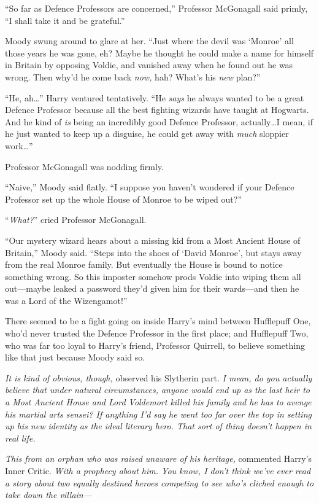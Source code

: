 “So far as Defence Professors are concerned,” Professor McGonagall said primly, “I shall take it and be grateful.”

Moody swung around to glare at her. “Just where the devil was ‘Monroe’ all those years he was gone, eh? Maybe he thought he could make a name for himself in Britain by opposing Voldie, and vanished away when he found out he was wrong. Then why’d he come back \emph{now,} hah? What’s his \emph{new} plan?”

“He, ah…” Harry ventured tentatively. “He \emph{says} he always wanted to be a great Defence Professor because all the best fighting wizards have taught at Hogwarts. And he kind of \emph{is} being an incredibly good Defence Professor, actually…I mean, if he just wanted to keep up a disguise, he could get away with \emph{much} sloppier work…”

Professor McGonagall was nodding firmly.

“Naive,” Moody said flatly. “I suppose you haven’t wondered if your Defence Professor set up the whole House of Monroe to be wiped out?”

“\emph{What?}” cried Professor McGonagall.

“Our mystery wizard hears about a missing kid from a Most Ancient House of Britain,” Moody said. “Steps into the shoes of ‘David Monroe’, but stays away from the real Monroe family. But eventually the House is bound to notice something wrong. So this imposter somehow prods Voldie into wiping them all out—maybe leaked a password they’d given him for their wards—and then he was a Lord of the Wizengamot!”

There seemed to be a fight going on inside Harry’s mind between Hufflepuff One, who’d never trusted the Defence Professor in the first place; and Hufflepuff Two, who was far too loyal to Harry’s friend, Professor Quirrell, to believe something like that just because Moody said so.

\emph{It \emph{is} kind of obvious, though,} observed his Slytherin part. \emph{I mean, do you actually believe that under natural circumstances, anyone would end up as the last heir to a Most Ancient House \emph{and} Lord Voldemort killed his family \emph{and} he has to avenge his martial arts sensei? If anything I’d say he went too far over the top in setting up his new identity as the ideal literary hero. That sort of thing doesn’t happen in real life.}

\emph{This from an orphan who was raised unaware of his heritage,} commented Harry’s Inner Critic. \emph{With a prophecy about him. You know, I don’t think we’ve ever read a story about two equally destined heroes competing to see who’s cliched enough to take down the villain—}


